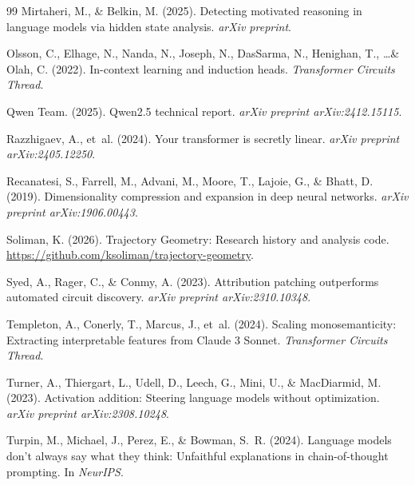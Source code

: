\documentclass[11pt,twocolumn]{article}
\begin{document}
\begin{thebibliography}{99}
Mirtaheri, M., \& Belkin, M. (2025).
\newblock Detecting motivated reasoning in language models via hidden state analysis.
\newblock \emph{arXiv preprint}.

Olsson, C., Elhage, N., Nanda, N., Joseph, N., DasSarma, N., Henighan, T., \ldots \& Olah, C. (2022).
\newblock In-context learning and induction heads.
\newblock \emph{Transformer Circuits Thread}.

Qwen Team. (2025).
\newblock Qwen2.5 technical report.
\newblock \emph{arXiv preprint arXiv:2412.15115}.

Razzhigaev, A., et~al. (2024).
\newblock Your transformer is secretly linear.
\newblock \emph{arXiv preprint arXiv:2405.12250}.

Recanatesi, S., Farrell, M., Advani, M., Moore, T., Lajoie, G., \& Bhatt, D. (2019).
\newblock Dimensionality compression and expansion in deep neural networks.
\newblock \emph{arXiv preprint arXiv:1906.00443}.

Soliman, K. (2026).
\newblock Trajectory Geometry: Research history and analysis code.
\newblock \url{https://github.com/ksoliman/trajectory-geometry}.

Syed, A., Rager, C., \& Conmy, A. (2023).
\newblock Attribution patching outperforms automated circuit discovery.
\newblock \emph{arXiv preprint arXiv:2310.10348}.

Templeton, A., Conerly, T., Marcus, J., et~al. (2024).
\newblock Scaling monosemanticity: Extracting interpretable features from Claude 3 Sonnet.
\newblock \emph{Transformer Circuits Thread}.

Turner, A., Thiergart, L., Udell, D., Leech, G., Mini, U., \& MacDiarmid, M. (2023).
\newblock Activation addition: Steering language models without optimization.
\newblock \emph{arXiv preprint arXiv:2308.10248}.

Turpin, M., Michael, J., Perez, E., \& Bowman, S.~R. (2024).
\newblock Language models don't always say what they think: Unfaithful explanations in chain-of-thought prompting.
\newblock In \emph{NeurIPS}.


\end{thebibliography}
\end{document}
